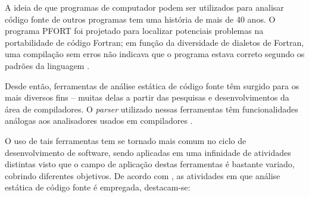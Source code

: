 A ideia de que programas de computador podem ser utilizados para analisar
código fonte de outros programas tem uma história de mais de 40 anos.  O
programa PFORT \cite{Ryder1974} foi projetado para localizar potenciais
problemas na portabilidade de código Fortran; em função da diversidade de
dialetos de Fortran, uma compilação sem erros não indicava que o programa
estava correto segundo os padrões da linguagem \cite{Wichmann1995}.

Desde então, ferramentas de análise estática de código fonte têm surgido para
os mais diversos fins -- muitas delas a partir das pesquisas e
desenvolvimentos da área de compiladores.  O {\it parser} utilizado nessas
ferramentas têm funcionalidades análogas aos analisadores usados em
compiladores \cite{Anderson2008}.

O uso de tais ferramentas tem se
tornado mais comum no ciclo de desenvolvimento de
software, sendo aplicadas em uma infinidade de atividades distintas visto que o
campo de aplicação destas ferramentas é bastante variado, cobrindo diferentes
objetivos. De acordo com , as atividades em que análise
estática de código fonte é empregada, destacam-se:

